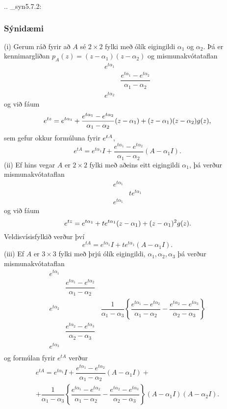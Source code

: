 .. _syn5.7.2:

\subsubsection{Sýnidæmi} (i) Gerum ráð fyrir að $A$ sé $2\times 2$ fylki með ólík
eigingildi $\alpha_1$ og $\alpha_2$.  Þá er 
kennimargliðan $p_A(z)=(z-\alpha_1)(z-\alpha_2)$ og mismunakvótataflan
 $$\begin{matrix}
e^{t\alpha_1}\\
&\dfrac{e^{t\alpha_1}-e^{t\alpha_2}}{\alpha_1-\alpha_2}\\
e^{t\alpha_2}
\end{matrix}
 $$
og við fáum 
 $$e\sp{tz} = e\sp{t\alpha_1}+ 
\dfrac{e^{t\alpha_1}-e^{t\alpha_2}}{\alpha_1-\alpha_2}
(z-\alpha_1) +(z-\alpha_1)(z-\alpha_2)g(z),
 $$
sem gefur okkur formúluna fyrir $e\sp{tA}$, 
 $$e^{tA}=e^{t\alpha_1}I+\dfrac{e^{t\alpha_1}-e^{t\alpha_2}}
{\alpha_1-\alpha_2}(A-\alpha_1I).
 $$
(ii) Ef hins vegar $A$ er $2\times 2$ fylki með aðeins eitt
eigingildi $\alpha_1$, þá verður mismunakvótataflan
 $$\begin{matrix}
e^{t\alpha_1}\\
&te^{t\alpha_1}\\
e^{t\alpha_1}
\end{matrix}
 $$
og við fáum 
 $$e\sp{tz}=e\sp{t\alpha_1}+te\sp{t\alpha_1}(z-\alpha_1)+(z-\alpha_1)\sp
2g(z). 
 $$
Veldisvísisfylkið verður því
 $$e^{tA}=e^{t\alpha_1}I+te^{t\alpha_1}(A-\alpha_1I).
 $$
(iii)  Ef $A$ er $3\times 3$ fylki með þrjú ólík eigingildi,
${\alpha}_1,{\alpha}_2,{\alpha}_3$ þá verður mismunakvótataflan
 $$\begin{matrix}
e^{t{\alpha}_1}\\
&\dfrac{e^{t\alpha_1}-e^{t\alpha_2}}{\alpha_1-\alpha_2}\\
e^{t\alpha_2}& 
&\dfrac1{\alpha_1-\alpha_3}\left\{
\dfrac{e^{t\alpha_1}-e^{t\alpha_2}}{\alpha_1-\alpha_2}-
\dfrac{e^{t\alpha_2}-e^{t\alpha_3}}{\alpha_2-\alpha_3}
\right\}\\ 
&\dfrac{e^{t\alpha_2}-e^{t\alpha_3}}{\alpha_2-\alpha_3}\\
e^{t\alpha_3}\\
\end{matrix}
 $$
og formúlan fyrir $e^{tA}$ verður
\begin{multline*}
e^{tA}=e^{t\alpha_1}I+\dfrac{e^{t\alpha_1}-e^{t\alpha_2}}
{\alpha_1-\alpha_2}(A-\alpha_1I)+\\
+\dfrac1{\alpha_1-\alpha_3}\left\{
\dfrac{e^{t\alpha_1}-e^{t\alpha_2}}{\alpha_1-\alpha_2}-
\dfrac{e^{t\alpha_2}-e^{t\alpha_3}}{\alpha_2-\alpha_3}
\right\} (A-\alpha_1I)(A-\alpha_2I).
\end{multline*}
